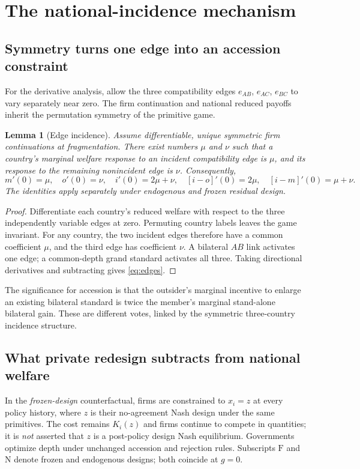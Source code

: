 \documentclass[11pt,a4paper]{article}
\newtheorem{lemma}[theorem]{Lemma}
\theoremstyle{remark}\newtheorem{remark}[theorem]{Remark}
\newcommand{\N}{\mathrm{N}}\newcommand{\F}{\mathrm{F}}
\begin{document}
\section{The national-incidence mechanism}\label{sec:mechanism}
\subsection{Symmetry turns one edge into an accession constraint}
For the derivative analysis, allow the three compatibility edges $e_{AB}$, $e_{AC}$, $e_{BC}$ to vary separately near zero. The firm continuation and national reduced payoffs inherit the permutation symmetry of the primitive game.
\begin{lemma}[Edge incidence]\label{lem:edges}
Assume differentiable, unique symmetric firm continuations at fragmentation. There exist numbers $\mu$ and $\nu$ such that a country's marginal welfare response to an incident compatibility edge is $\mu$, and its response to the remaining nonincident edge is $\nu$. Consequently,
\begin{equation}\label{eq:edges}
m'(0)=\mu,\quad o'(0)=\nu,\quad i'(0)=2\mu+\nu,\quad
[i-o]'(0)=2\mu,\quad [i-m]'(0)=\mu+\nu.
\end{equation}
The identities apply separately under endogenous and frozen residual design.
\end{lemma}
\begin{proof}
Differentiate each country's reduced welfare with respect to the three independently variable edges at zero. Permuting country labels leaves the game invariant. For any country, the two incident edges therefore have a common coefficient $\mu$, and the third edge has coefficient $\nu$. A bilateral $AB$ link activates one edge; a common-depth grand standard activates all three. Taking directional derivatives and subtracting gives \eqref{eq:edges}.
\end{proof}

The significance for accession is that the outsider's marginal incentive to enlarge an existing bilateral standard is twice the member's marginal stand-alone bilateral gain. These are different votes, linked by the symmetric three-country incidence structure.

\subsection{What private redesign subtracts from national welfare}
In the \emph{frozen-design} counterfactual, firms are constrained to $x_i=z$ at every policy history, where $z$ is their no-agreement Nash design under the same primitives. The cost remains $K_i(z)$ and firms continue to compete in quantities; it is \emph{not} asserted that $z$ is a post-policy design Nash equilibrium. Governments optimize depth under unchanged accession and rejection rules. Subscripts $\F$ and $\N$ denote frozen and endogenous designs; both coincide at $g=0$.
\end{document}

